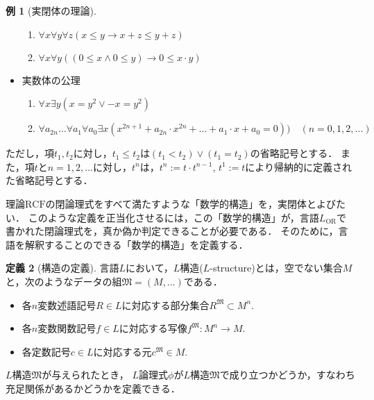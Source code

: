\documentclass[uplatex, dvipdfmx]{jsarticle}
\numberwithin{equation}{section}
\newcommand{\M}{\mathfrak{M}}
\newcommand{\RCF}{\mathrm{RCF}}
\newcommand{\map}[3]{{#1}\colon{#2}\rightarrow{#3}}
\theoremstyle{definition}
\newtheorem{definition}{定義}[section]
\newtheorem{example}[definition]{例}
\begin{document}
\begin{example}[実閉体の理論]
\begin{itemize}
\begin{enumerate}
               \item $\forall x \forall y \forall z (x \leq y \rightarrow x + z \leq y + z)$
               \item $\forall x \forall y ((0 \leq x \land 0 \leq y) \rightarrow 0 \leq x \cdot y )$
          \end{enumerate}
          \item 実数体の公理
          \begin{enumerate}
               \item $\forall x \exists y (x=y^2 \lor -x=y^2)$
               \item $\forall a_{2n} \dots \forall a_1 \forall a_0 \exists x(x^{2n+1} + a_{2n}\cdot x^{2n} + \dots +  a_1 \cdot x + a_0 = 0)) \quad (n=0,1,2,\dots)$ 
          \end{enumerate}
     \end{itemize}

     ただし，項$t_1, t_2$に対し，$t_1 \leq t_2$は$(t_1 < t_2)\lor(t_1 = t_2)$の省略記号とする．
     また，項$t$と$n=1,2,\dots$に対し，$t^n$は，$t^n:=t \cdot t^{n-1}$, $t^1:=t$により帰納的に定義された省略記号とする．
\end{example}

理論$\RCF$の閉論理式をすべて満たすような「数学的構造」を，実閉体とよびたい．
このような定義を正当化させるには，この「数学的構造」が，言語$L_\mathrm{OR}$で書かれた閉論理式を，真か偽か判定できることが必要である．
そのために，言語を解釈することのできる「数学的構造」を定義する．

\begin{definition}[構造の定義]
     言語$L$において，$L$構造($L$-structure)とは，空でない集合$M$と，次のようなデータの組$\M=(M,\dots)$である．
     \begin{itemize}
          \item 各$n$変数述語記号$R \in L$に対応する部分集合$R^\M \subset M^n$.
          \item 各$n$変数関数記号$f \in L$に対応する写像$\map{f^\M}{M^n}{M}$.
          \item 各定数記号$c \in L$に対応する元$c^\M \in M$.
     \end{itemize}
\end{definition}

$L$構造$\M$が与えられたとき，
$L$論理式$\phi$が$L$構造$\M$で成り立つかどうか，すなわち充足関係があるかどうかを定義できる．
\end{document}
